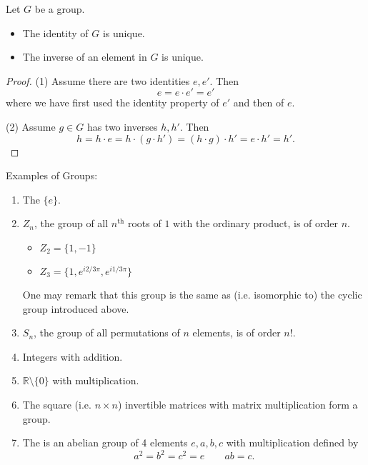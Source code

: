 \begin{lemma}
Let $G$ be a group.
\begin{itemize}
\item The identity of $G$ is unique.
\item The inverse of an element in $G$ is unique.
\end{itemize}
\end{lemma}
\begin{proof}
(1) Assume there are two identities $e, e'$. Then
\[ e = e\cdot e' = e' \]
where we have first used the identity property of $e'$ and then of $e$.

(2) Assume $g\in G$ has two inverses $h,h'$. Then
\[ h = h\cdot e = h\cdot (g\cdot h') = (h\cdot g)\cdot h' = e\cdot h' = h'. \] 
\end{proof}


\begin{example}
Examples of Groups:
\begin{enumerate}
\item The  $\{e\}$.
\item $Z_n$, the group of all $n^{\text{th}}$ roots of $1$ with the ordinary product, is of order $n$.
\begin{itemize}
\item $Z_2 = \{1,-1\}$
\item $Z_3 = \{1, e^{i2/3\pi}, e^{i1/3\pi}\}$
\end{itemize}
One may remark that this group is the same as (i.e. isomorphic to) the cyclic group introduced above.
\item $S_n$, the group of all permutations of $n$ elements, is of order $n!$.
\item Integers with addition.
\item $\mathbb{R}\setminus\{0\}$ with multiplication.
\item The square (i.e. $n\times n$) invertible matrices with matrix multiplication form a group.
\item The  is an abelian group of 4 elements $e,a,b,c$ with multiplication defined by
\[ a^2 = b^2 = c^2 = e \qquad ab = c. \]
\end{enumerate}
\end{example}

